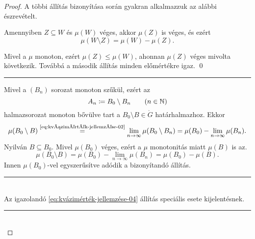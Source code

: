 \documentclass[
]{elteikthesis}[2024/04/26]
\begin{document}
\begin{proof}
		\newpage

		A többi állítás bizonyítása során gyakran alkalmazzuk az alábbi észrevételt.
		
		\begin{lem*}
			Amennyiben \( Z \subseteq W \) és \( \mu(W) \) véges,
			akkor \( \mu(Z) \) is véges, és ezért
			\[
				\mu(W \setminus Z) = \mu(W) - \mu(Z).
			\]
		\end{lem*}
		\begin{proof*}
			Mivel a \( \mu \) monoton, ezért \( \mu(Z) \leq \mu(W) \), 
			ahonnan \( \mu(Z) \) véges mivolta következik.
			Továbbá a második állítás minden előmértékre igaz. \qed
		\end{proof*}
		
		\vspace{9pt}
		\hrule
		\vspace{9pt}
		
		\fbox{\ref{eq:kvázimérték-jellemzése-02} \( \Longrightarrow \)
			  \ref{eq:kvázimérték-jellemzése-03}}
		Mivel a \( (B_n) \) sorozat monoton szűkül, ezért az 
		\[
			A_n \coloneq B_0 \setminus B_n \qquad (n \in \mathbb{N})
		\]
		halmazsorozat monoton bővülve tart a \( B_0 \setminus B \in \ring{G} \) határhalmazhoz.
		Ekkor
		\[
			\mu(B_0 \setminus B) \overset{\text{\ref{eq:kvázimérték-jellemzése-02}}}{=}
			\lim_{n \to \infty} \mu(B_0 \setminus B_n) =
			\mu(B_0) - \lim_{n \to \infty} \mu(B_n).
		\]
		Nyilván \( B \subseteq B_0 \). 
		Mivel \( \mu(B_0) \) véges, ezért a \( \mu \) monotonitás miatt \( \mu(B) \) is az.
		\[
			\mu(B_0 \setminus B) =
			\mu(B_0) - \lim_{n \to \infty} \mu(B_n) =
			\mu(B_0) - \mu(B).
		\]
		Innen \( \mu(B_0) \)-vel egyszerűsítve adódik a bizonyítandó állítás.
		
		\noindent\rule{\linewidth}{0.4pt}\\
		
		\fbox{\ref{eq:kvázimérték-jellemzése-03} \( \Longrightarrow \)
			  \ref{eq:kvázimérték-jellemzése-04}}
		Az igazolandó \ref{eq:kvázimérték-jellemzése-04} állítás speciális esete \az{\ref{eq:kvázimérték-jellemzése-03}} kijelentésnek.
		
		\noindent\rule{\linewidth}{0.4pt}\\
		

\end{proof}
\end{document}

